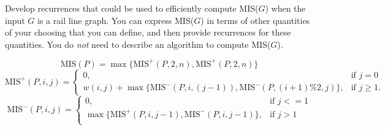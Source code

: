 \documentclass[11pt]{article}
\def\question#1{\red{#1}}
\def\soln#1{\par\blu{#1}} %
\def\blu#1{{\color{blu}#1}}
\def\red#1{{\color{red}#1}}
\begin{document}
\question{Develop recurrences that could be used to efficiently compute MIS($G$) when the input $G$ is a rail line graph.} You
can express MIS($G$) in terms of other quantities of your
choosing that you can define, and then provide recurrences for these quantities.
You do \emph{not} need to describe an algorithm to compute MIS($G$).
\soln{
\[
  \mbox{MIS}(P) = \max\{\mbox{MIS}^+(P,2,n) , \mbox{MIS}^+(P,2,n)\}
\]
\[
\mbox{MIS}^+(P,i,j) = \left \{\begin{array}{ll}
                   0, & \mbox{if } j = 0 \\
                   w(i,j) + \max \{ \mbox{MIS}^-(P,i,(j-1)), \mbox{MIS}^-(P,(i+1)\%2, j) \}, & \mbox{if } j \ge 1.
                   \end{array} \right.
\]
\[
\mbox{MIS}^-(P,i,j) = \left \{\begin{array}{ll}
                0, & \mbox{if } j <= 1 \\[.3in]
                \max \{ \mbox{MIS}^+(P,i,j-1), \mbox{MIS}^-(P,i,j-1) \}, & \mbox{if } j > 1 \\
                \end{array} \right.
\]
}
\end{document}
